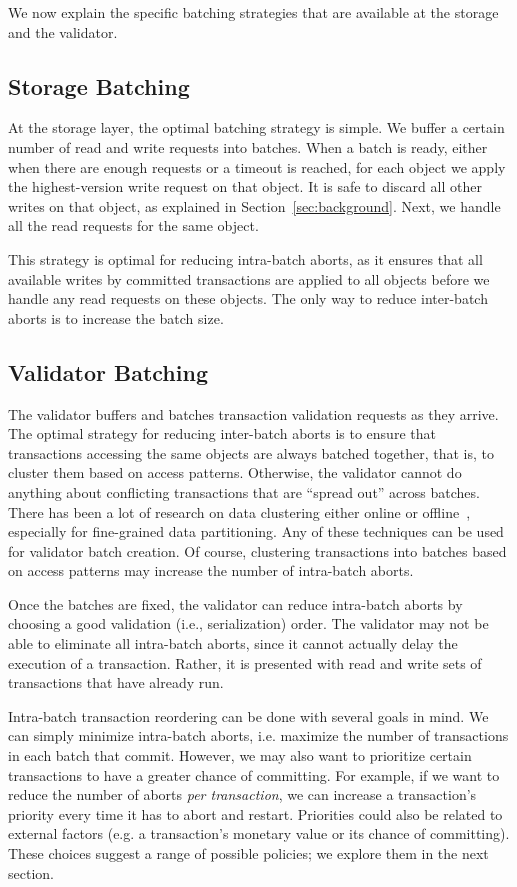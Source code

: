 We now explain the specific batching strategies that are available at the storage and the validator.

\subsection{Storage Batching}
At the storage layer, the optimal batching strategy is simple. We buffer a certain number of read and write requests into batches. When a batch is ready, either when there are enough requests or a timeout is reached, for each object we apply the highest-version write request on that object. It is safe to discard all other writes on that object, as explained in Section~\ref{sec:background}. Next, we handle all the read requests for the same object. 

This strategy is optimal for reducing intra-batch aborts, as it ensures that all available writes by committed transactions are applied to all objects before we handle any read requests on these objects. The only way to reduce inter-batch aborts is to increase the batch size.

\subsection{Validator Batching}\label{subsec:overview:validator}

The validator buffers and batches transaction validation requests as they arrive. The optimal strategy for reducing inter-batch aborts is to ensure that transactions accessing the same objects are always batched together, that is, to cluster them based on access patterns.  Otherwise, the validator cannot do anything about conflicting transactions that are ``spread out'' across batches. There has been a lot of research on data clustering either online or offline~\cite{pavlo2012skew, elmore2015squall}, especially for fine-grained data partitioning. Any of these techniques can be used for validator batch creation. Of course, clustering transactions into batches based on access patterns may increase the number of intra-batch aborts.

Once the batches are fixed, the validator can reduce intra-batch aborts by choosing a good validation (i.e., serialization) order. The validator may not be able to eliminate all intra-batch aborts, since it cannot actually delay the execution of a transaction. Rather, it is presented with read and write sets of transactions that have already run. 

Intra-batch transaction reordering can be done with several goals in mind. We can simply minimize intra-batch aborts, i.e. maximize the number of transactions in each batch that commit. However, we may also want to prioritize certain transactions to have a greater chance of committing. For example, if we want to reduce the number of aborts \emph{per transaction}, we can increase a transaction's priority every time it has to abort and restart. Priorities could also be related to external factors (e.g. a transaction's monetary value or its chance of committing). These choices suggest a range of possible policies; we explore them in the next section.


